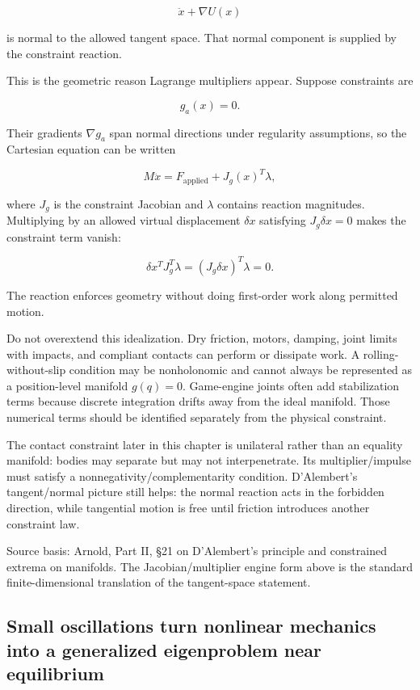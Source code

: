 \[
\ddot x+\nabla U(x)
\]

is normal to the allowed tangent space. That normal component is supplied by the constraint reaction.

This is the geometric reason Lagrange multipliers appear. Suppose constraints are

\[
g_a(x)=0.
\]

Their gradients \(\nabla g_a\) span normal directions under regularity assumptions, so the Cartesian equation can be written

\[
M\ddot x
=
F_{\mathrm{applied}}
+
J_g(x)^T\lambda,
\]

where \(J_g\) is the constraint Jacobian and \(\lambda\) contains reaction magnitudes. Multiplying by an allowed virtual displacement \(\delta x\) satisfying \(J_g\delta x=0\) makes the constraint term vanish:

\[
\delta x^T J_g^T\lambda
=
(J_g\delta x)^T\lambda
=
0.
\]

The reaction enforces geometry without doing first-order work along permitted motion.

Do not overextend this idealization. Dry friction, motors, damping, joint limits with impacts, and compliant contacts can perform or dissipate work. A rolling-without-slip condition may be nonholonomic and cannot always be represented as a position-level manifold \(g(q)=0\). Game-engine joints often add stabilization terms because discrete integration drifts away from the ideal manifold. Those numerical terms should be identified separately from the physical constraint.

The contact constraint later in this chapter is unilateral rather than an equality manifold: bodies may separate but may not interpenetrate. Its multiplier/impulse must satisfy a nonnegativity/complementarity condition. D'Alembert's tangent/normal picture still helps: the normal reaction acts in the forbidden direction, while tangential motion is free until friction introduces another constraint law.

Source basis: Arnold, Part II, §21 on D'Alembert's principle and constrained extrema on manifolds. The Jacobian/multiplier engine form above is the standard finite-dimensional translation of the tangent-space statement.

\subsection{Small oscillations turn nonlinear mechanics into a generalized eigenproblem near equilibrium}\label{06-engine-ii-ch033-small-oscillations-turn-nonlinear-mechanics-into-a-generalized-eigenproblem-near-equilibrium}


